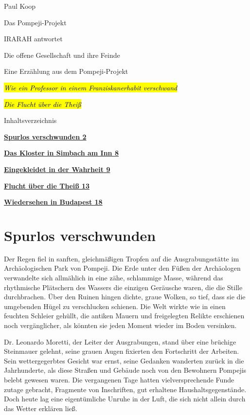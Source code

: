 \documentclass[
]{article}
\author{}
\date{}
\begin{document}
{
\setcounter{tocdepth}{3}
\tableofcontents
}
Paul Koop

Das Pompeji-Projekt

IRARAH antwortet

Die offene Gesellschaft und ihre Feinde

Eine Erzählung aus dem Pompeji-Projekt

\emph{\hl{Wie ein Professor in einem Franziskanerhabit verschwand}}

\emph{\hl{Die Flucht über die Theiß}}

Inhaltsverzeichnis

\hyperref[spurlos-verschwunden]{\textbf{Spurlos verschwunden 2}}

\hyperref[das-kloster-in-simbach-am-inn]{\textbf{Das Kloster in Simbach am Inn 8}}

\hyperref[eingekleidet-in-der-wahrheit]{\textbf{Eingekleidet in der Wahrheit 9}}

\hyperref[flucht-uxfcber-die-theiuxdf]{\textbf{Flucht über die Theiß 13}}

\hyperref[wiedersehen-in-budapest]{\textbf{Wiedersehen in Budapest 18}}

\section{Spurlos verschwunden}\label{spurlos-verschwunden}

Der Regen fiel in sanften, gleichmäßigen Tropfen auf die Ausgrabungsstätte im Archäologischen Park von Pompeji. Die Erde unter den Füßen der Archäologen verwandelte sich allmählich in eine zähe, schlammige Masse, während das rhythmische Plätschern des Wassers die einzigen Geräusche waren, die die Stille durchbrachen. Über den Ruinen hingen dichte, graue Wolken, so tief, dass sie die umgebenden Hügel zu verschlucken schienen. Die Welt wirkte wie in einen feuchten Schleier gehüllt, die antiken Mauern und freigelegten Relikte erschienen noch vergänglicher, als könnten sie jeden Moment wieder im Boden versinken.

Dr. Leonardo Moretti, der Leiter der Ausgrabungen, stand über eine brüchige Steinmauer gelehnt, seine grauen Augen fixierten den Fortschritt der Arbeiten. Sein wettergegerbtes Gesicht war ernst, seine Gedanken wanderten zurück in die Jahrhunderte, als diese Straßen und Gebäude noch von den Bewohnern Pompejis belebt gewesen waren. Die vergangenen Tage hatten vielversprechende Funde zutage gebracht, Fragmente von Inschriften, gut erhaltene Haushaltsgegenstände. Doch heute lag eine eigentümliche Unruhe in der Luft, die sich nicht allein durch das Wetter erklären ließ.
\end{document}
